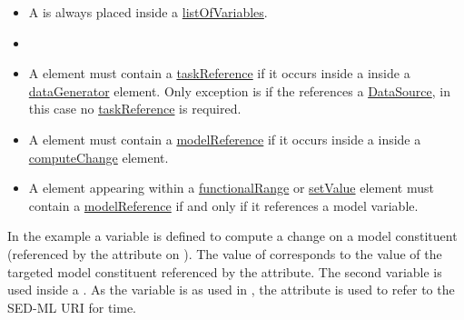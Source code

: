 \begin{itemize}
	\item A \Variable is always placed inside a \hyperref[class:listOfVariables]{listOfVariables}.  
	\item {}
	\item A \Variable element must contain a \hyperref[sec:taskReference]{taskReference} if it occurs inside a \hyperref[class:listOfVariables]{} inside a \hyperref[class:dataGenerator]{dataGenerator} element. Only exception is if the \Variable references a \hyperref[class:dataSource]{DataSource}, in this case no \hyperref[sec:taskReference]{taskReference} is required.
	\item A \Variable element must contain a \hyperref[sec:modelReference]{modelReference} if it occurs inside a \hyperref[class:listOfVariables]{} inside a \hyperref[class:computeChange]{computeChange} element.
	\item A \Variable  element appearing within a \hyperref[class:functionalRange]{functionalRange} or \hyperref[class:setValue]{setValue} element must contain a \hyperref[sec:modelReference]{modelReference} if and only if it references a model variable.
\end{itemize}

In the example a variable  is defined to compute a change on a model constituent (referenced by the \hyperref[sec:target]{} attribute on \hyperref[class:computeChange]{}). The value of  corresponds to the value of the targeted model constituent referenced by the  attribute. The second variable  is used inside a \hyperref[class:dataGenerator]{}. As the variable is  as used in , the \hyperref[sec:symbol]{} attribute is used to refer to the SED-ML URI for time.

